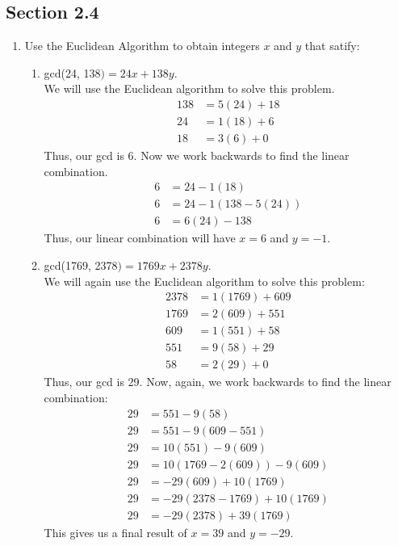 \documentclass[10pt,oneside]{book}
\newcommand{\gspc}{\vspace{0.13cm}} %
\newcommand{\gline}{\gspc\\} %
\begin{document}
\newcommand{\cg}[1]{\color{OliveGreen}#1\color{white}}
\newcommand{\cb}[1]{\color{BlueViolet}#1\color{white}}
\subsection*{Section 2.4}
\begin{enumerate}
	\item [2.] Use the Euclidean Algorithm to obtain integers $x$ and $y$ that satify:
	\begin{enumerate}
		\item [(b)] gcd(24, 138$) = 24x + 138y$.\gline
		We will use the Euclidean algorithm to solve this problem.
		\begin{align*}
			138 &= 5(24) + 18\\
			24 &= 1(18) + 6\\
			18 &= 3(6) + 0
		\end{align*}
		Thus, our gcd is 6. Now we work backwards to find the linear combination.
		\begin{align*}
			6 &= 24 - 1(18)\\
			6&= 24 - 1(138 - 5(24))\\
			6&= 6(24) - 138
		\end{align*}
		Thus, our linear combination will have $x = 6$ and $y = -1$. 
		\item [(d)] gcd(1769, 2378$) = 1769x + 2378y$.\gline
		We will again use the Euclidean algorithm to solve this problem:
		\begin{align*}
			2378 &= 1(1769) + 609\\
			1769 &= 2(609) + 551\\
			609 &= 1(551) + 58\\
			551 &= 9(58) + 29 \\
			58 &= 2(29) + 0
		\end{align*}
		Thus, our gcd is 29. Now, again, we work backwards to find the linear combination:
		\begin{align*}
			29&= 551 -9(58)\\
			29&= 551 - 9(609 - 551)\\
			29 &= 10(551) - 9(609)\\
			29&= 10(1769 - 2(609)) - 9(609)\\
			29 &= -29(609) + 10(1769)\\
			29 &= -29(2378 - 1769) + 10(1769)\\
			29 &= -29(2378) + 39(1769)
		\end{align*}
		This gives us a final result of $x = 39$ and $y = -29$.

\end{enumerate}
\end{enumerate}
\end{document}
